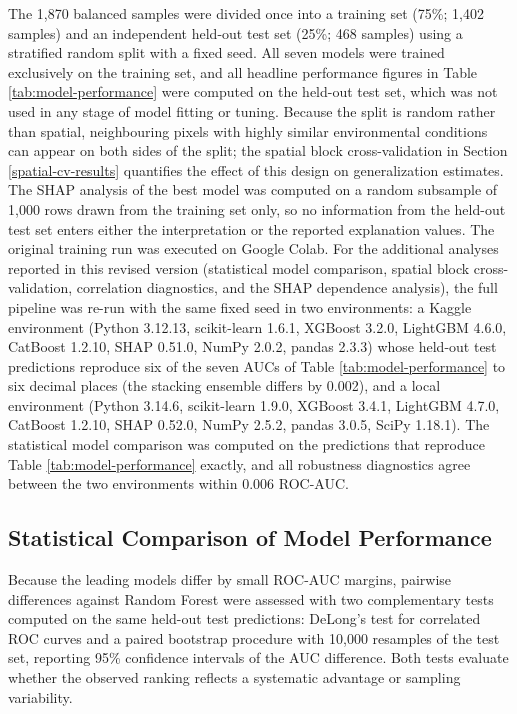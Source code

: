 \documentclass[11pt,twoside]{article}
\begin{document}
The 1,870 balanced samples were divided once into a training set (75\%; 1,402
samples) and an independent held-out test set (25\%; 468 samples) using a
stratified random split with a fixed seed. All seven models were trained
exclusively on the training set, and all headline performance figures in
Table \ref{tab:model-performance} were computed on the held-out test set, which
was not used in any stage of model fitting or tuning. Because the split is
random rather than spatial, neighbouring pixels with highly similar
environmental conditions can appear on both sides of the split; the spatial
block cross-validation in Section \ref{spatial-cv-results} quantifies the
effect of this design on generalization estimates. The SHAP analysis of the
best model was computed on a random subsample of 1,000 rows drawn from the
training set only, so no information from the held-out test set enters either
the interpretation or the reported explanation values. The original training
run was executed on Google Colab. For the additional analyses reported in this
revised version (statistical model comparison, spatial block cross-validation,
correlation diagnostics, and the SHAP dependence analysis), the full pipeline
was re-run with the same fixed seed in two environments: a Kaggle environment
(Python 3.12.13, scikit-learn 1.6.1, XGBoost 3.2.0, LightGBM 4.6.0, CatBoost
1.2.10, SHAP 0.51.0, NumPy 2.0.2, pandas 2.3.3) whose held-out test predictions
reproduce six of the seven AUCs of Table \ref{tab:model-performance} to six
decimal places (the stacking ensemble differs by 0.002), and a local
environment (Python 3.14.6, scikit-learn 1.9.0, XGBoost 3.4.1, LightGBM 4.7.0,
CatBoost 1.2.10, SHAP 0.52.0, NumPy 2.5.2, pandas 3.0.5, SciPy 1.18.1). The
statistical model comparison was computed on the predictions that reproduce
Table \ref{tab:model-performance} exactly, and all robustness diagnostics agree
between the two environments within 0.006 ROC-AUC.

\subsection{Statistical Comparison of Model Performance}\label{statistical-comparison}

Because the leading models differ by small ROC-AUC margins, pairwise
differences against Random Forest were assessed with two complementary tests
computed on the same held-out test predictions: DeLong's test for correlated
ROC curves \cite{delong1988} and a paired bootstrap procedure with 10,000 resamples of the test
set, reporting 95\% confidence intervals of the AUC difference. Both tests
evaluate whether the observed ranking reflects a systematic advantage or
sampling variability.
\end{document}
